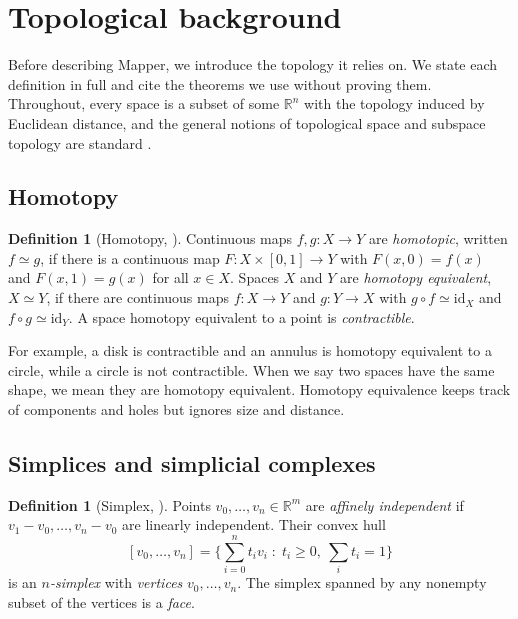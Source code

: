 \documentclass{article}
\newcommand{\R}{\mathbb{R}}
\theoremstyle{definition}
\newtheorem{definition}[theorem]{Definition}
\theoremstyle{remark}
\begin{document}
\section{Topological background}\label{sec:topology}
Before describing Mapper, we introduce the topology it relies on.
We state each definition in full and cite the theorems we use without proving them.
Throughout, every space is a subset of some $\R^n$ with the topology induced by Euclidean distance, and the general notions of topological space and subspace topology are standard \parencite{munkres2000topology}.

\subsection{Homotopy}
\begin{definition}[Homotopy, {\cite{hatcher2001}}]
Continuous maps $f, g : X \to Y$ are \emph{homotopic}, written $f \simeq g$, if there is a continuous map $F : X \times [0,1] \to Y$ with $F(x,0) = f(x)$ and $F(x,1) = g(x)$ for all $x \in X$.
Spaces $X$ and $Y$ are \emph{homotopy equivalent}, $X \simeq Y$, if there are continuous maps $f : X \to Y$ and $g : Y \to X$ with $g \circ f \simeq \mathrm{id}_X$ and $f \circ g \simeq \mathrm{id}_Y$.
A space homotopy equivalent to a point is \emph{contractible}.
\end{definition}
For example, a disk is contractible and an annulus is homotopy equivalent to a circle, while a circle is not contractible.
When we say two spaces have the same shape, we mean they are homotopy equivalent. Homotopy equivalence keeps track of components and holes but ignores size and distance.

\subsection{Simplices and simplicial complexes}
\begin{definition}[Simplex, {\cite{hatcher2001}}]
Points $v_0, \dots, v_n \in \R^m$ are \emph{affinely independent} if $v_1 - v_0, \dots, v_n - v_0$ are linearly independent.
Their convex hull
\[
  [v_0, \dots, v_n] = \Big\{ \textstyle\sum_{i=0}^n t_i v_i \;:\; t_i \ge 0,\ \sum_i t_i = 1 \Big\}
\]
is an \emph{$n$-simplex} with \emph{vertices} $v_0, \dots, v_n$.
The simplex spanned by any nonempty subset of the vertices is a \emph{face}.
\end{definition}
\end{document}
